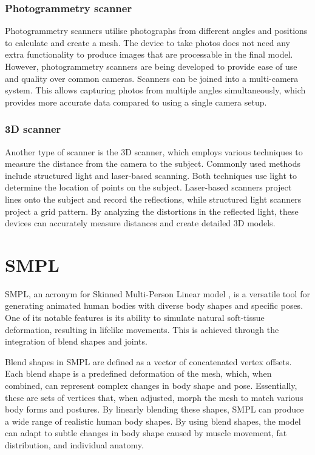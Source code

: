 \subsubsection{Photogrammetry scanner}
Photogrammetry scanners utilise photographs from different angles and positions to calculate and create a mesh. The device to take photos does not need any extra functionality to produce images that are processable in the final model. However, photogrammetry scanners are being developed to provide ease of use and quality over common cameras. Scanners can be joined into a multi-camera system. This allows capturing photos from multiple angles simultaneously, which provides more accurate data compared to using a single camera  setup.
\subsubsection{3D scanner}
Another type of scanner is the 3D scanner, which employs various techniques to measure the distance from the camera to the subject. Commonly used methods include structured light and laser-based scanning. Both techniques use light to determine the location of points on the subject. Laser-based scanners project lines onto the subject and record the reflections, while structured light scanners project a grid pattern. By analyzing the distortions in the reflected light, these devices can accurately measure distances and create detailed 3D models.

\section{SMPL}
SMPL, an acronym for Skinned Multi-Person Linear model \cite{smpl}, is a versatile tool for generating animated human bodies with diverse body shapes and specific poses. One of its notable features is its ability to simulate natural soft-tissue deformation, resulting in lifelike movements. This is achieved through the integration of blend shapes and joints.

Blend shapes in SMPL are defined as a vector of concatenated vertex offsets. Each blend shape is a predefined deformation of the mesh, which, when combined, can represent complex changes in body shape and pose. Essentially, these are sets of vertices that, when adjusted, morph the mesh to match various body forms and postures. By linearly blending these shapes, SMPL can produce a wide range of realistic human body shapes. By using blend shapes, the model can adapt to subtle changes in body shape caused by muscle movement, fat distribution, and individual anatomy.

